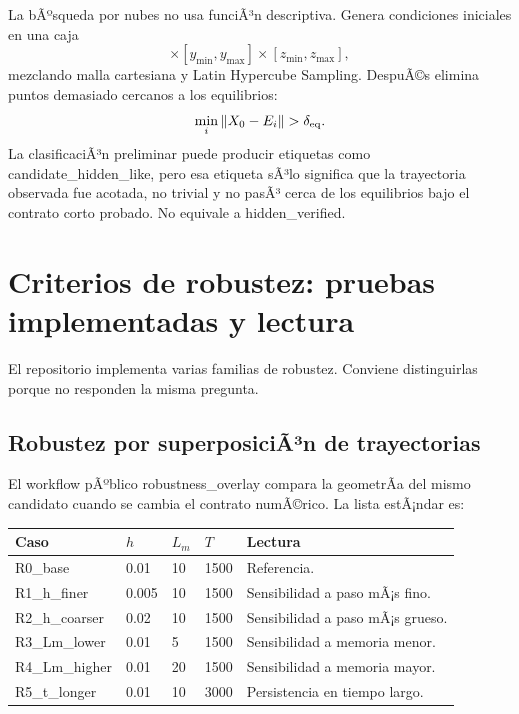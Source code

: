 \documentclass[11pt]{article}
\DeclareRobustCommand{\codepath}[1]{\begingroup\Urlmuskip=0mu plus 2mu\path{#1}\endgroup}
\def\codepath#1{#1}%
\begin{document}
La bÃºsqueda por nubes no usa funciÃ³n descriptiva. Genera condiciones iniciales en una caja
\begin{equation}
[x_{\min},x_{\max}]\times[y_{\min},y_{\max}]\times[z_{\min},z_{\max}],
\end{equation}
mezclando malla cartesiana y Latin Hypercube Sampling. DespuÃ©s elimina puntos demasiado cercanos a los equilibrios:
\begin{equation}
\min_i\|X_0-E_i\|>\delta_{\rm eq}.
\end{equation}
La clasificaciÃ³n preliminar puede producir etiquetas como \codepath{candidate_hidden_like}, pero esa etiqueta sÃ³lo significa que la trayectoria observada fue acotada, no trivial y no pasÃ³ cerca de los equilibrios bajo el contrato corto probado. No equivale a \codepath{hidden_verified}.

\section{Criterios de robustez: pruebas implementadas y lectura}
\label{sec:robustez_todas_pruebas}

El repositorio implementa varias familias de robustez. Conviene distinguirlas porque no responden la misma pregunta.

\subsection{Robustez por superposiciÃ³n de trayectorias}

El workflow pÃºblico \codepath{robustness_overlay} compara la geometrÃ­a del mismo candidato cuando se cambia el contrato numÃ©rico. La lista estÃ¡ndar es:
\begin{center}
\begin{tabular}{@{}lllll@{}}
\toprule
Caso & \(h\) & \(L_m\) & \(T\) & Lectura\\
\midrule
\codepath{R0_base} & 0.01 & 10 & 1500 & Referencia.\\
\codepath{R1_h_finer} & 0.005 & 10 & 1500 & Sensibilidad a paso mÃ¡s fino.\\
\codepath{R2_h_coarser} & 0.02 & 10 & 1500 & Sensibilidad a paso mÃ¡s grueso.\\
\codepath{R3_Lm_lower} & 0.01 & 5 & 1500 & Sensibilidad a memoria menor.\\
\codepath{R4_Lm_higher} & 0.01 & 20 & 1500 & Sensibilidad a memoria mayor.\\
\codepath{R5_t_longer} & 0.01 & 10 & 3000 & Persistencia en tiempo largo.\\
\bottomrule
\end{tabular}
\end{center}
\end{document}
